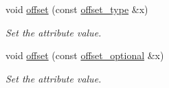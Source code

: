 \begin{DoxyCompactItemize}
void \hyperlink{classDataArray__t_ac133def4ed8ae6c623d0144f036a18d7}{offset} (const \hyperlink{classDataArray__t_a7b840c5f08bd2c65cd3c5e24ad132cfb}{offset\+\_\+type} \&x)
\begin{DoxyCompactList}\small\item\em Set the attribute value. \end{DoxyCompactList}\item 
void \hyperlink{classDataArray__t_a5abb95d7ab6fb95015c06de57a6ccbc9}{offset} (const \hyperlink{classDataArray__t_a4bc33060e7c386b658c752347ac5f03e}{offset\+\_\+optional} \&x)
\begin{DoxyCompactList}\small\item\em Set the attribute value. \end{DoxyCompactList}\end{DoxyCompactItemize}

